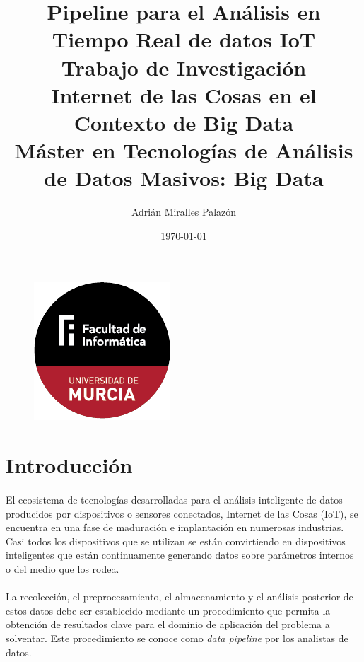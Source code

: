 \documentclass[12pt, a4paper]{article}
\begin{document}
        \title{%
            \huge \textbf{Pipeline para el Análisis en Tiempo Real de datos IoT} \\
            \LARGE Trabajo de Investigación \\
            \Large Internet de las Cosas en el Contexto de Big Data\\
            \normalsize Máster en Tecnologías de Análisis de Datos Masivos: Big Data
        }
        \author{Adrián Miralles Palazón}
        \date{\today}
        \maketitle

        \begin{figure}[h]
            \centerline{\includegraphics[]{logo}}
        \end{figure}

        \clearpage
        \tableofcontents
        
        \clearpage
        \section{Introducción}

        \paragraph{}
        El ecosistema de tecnologías desarrolladas para el análisis inteligente de datos producidos por dispositivos o sensores conectados, Internet de las Cosas (IoT), se encuentra en una fase de maduración e implantación en numerosas industrias. Casi todos los dispositivos que se utilizan se están convirtiendo en dispositivos inteligentes que están continuamente generando datos sobre parámetros internos o del medio que los rodea.

        \paragraph{}
        La recolección, el preprocesamiento, el almacenamiento y el análisis posterior de estos datos debe ser establecido mediante un procedimiento que permita la obtención de resultados clave para el dominio de aplicación del problema a solventar. Este procedimiento se conoce como \textit{data pipeline} por los analistas de datos.
\end{document}
